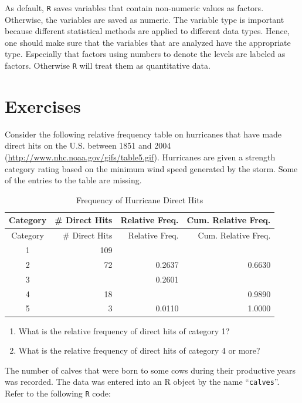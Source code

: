 \documentclass[]{krantz}
\theoremstyle{definition}
\theoremstyle{definition}
\theoremstyle{definition}
\theoremstyle{remark}
\let\BeginKnitrBlock\begin \let\EndKnitrBlock\end
\begin{document}
As default, \texttt{R} saves variables that contain non-numeric values as
factors. Otherwise, the variables are saved as numeric. The variable
type is important because different statistical methods are applied to
different data types. Hence, one should make sure that the variables
that are analyzed have the appropriate type. Especially that factors
using numbers to denote the levels are labeled as factors. Otherwise \texttt{R}
will treat them as quantitative data.

\hypertarget{exercises-1}{%
\section{Exercises}\label{exercises-1}}

\BeginKnitrBlock{exercise}
\protect\hypertarget{exr:unnamed-chunk-19}{}{\label{exr:unnamed-chunk-19} }Consider the following relative frequency table on
hurricanes that have made direct hits on the U.S. between 1851 and 2004
(\url{http://www.nhc.noaa.gov/gifs/table5.gif}). Hurricanes are given a
strength category rating based on the minimum wind speed generated by
the storm. Some of the entries to the table are missing.

\begin{longtable}[]{@{}crrr@{}}
\caption{Frequency of Hurricane Direct Hits}\tabularnewline
\toprule
Category & \# Direct Hits & Relative Freq. & Cum. Relative Freq.\tabularnewline
\midrule
\endfirsthead
\toprule
Category & \# Direct Hits & Relative Freq. & Cum. Relative Freq.\tabularnewline
\midrule
\endhead
1 & 109 & &\tabularnewline
2 & 72 & 0.2637 & 0.6630\tabularnewline
3 & & 0.2601 &\tabularnewline
4 & 18 & & 0.9890\tabularnewline
5 & 3 & 0.0110 & 1.0000\tabularnewline
\bottomrule
\end{longtable}

\begin{enumerate}
\def\labelenumi{\arabic{enumi}.}
\item
  What is the relative frequency of direct hits of category 1?
\item
  What is the relative frequency of direct hits of category 4 or more?
\end{enumerate}
\EndKnitrBlock{exercise}

\BeginKnitrBlock{exercise}
\protect\hypertarget{exr:unnamed-chunk-20}{}{\label{exr:unnamed-chunk-20} }The number of calves that were born to some cows during
their productive years was recorded. The data was entered into an R
object by the name ``\texttt{calves}''. Refer to the following \texttt{R} code:
\EndKnitrBlock{exercise}
\end{document}

